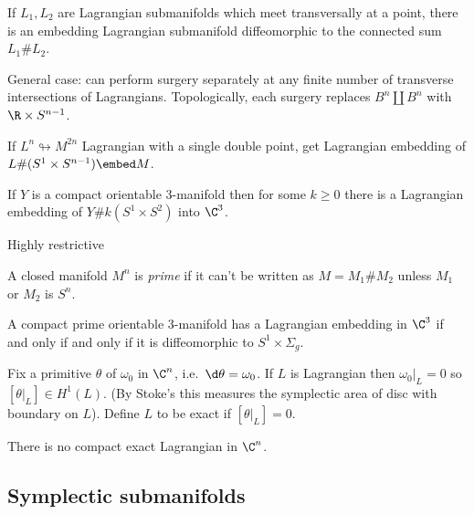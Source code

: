 \documentclass[a4paper]{article}
\newcommand{\immersion}{\looparrowright}
\begin{document}
\begin{corollary}
  If \(L_1, L_2\) are Lagrangian submanifolds which meet transversally at a point, there is an embedding Lagrangian submanifold diffeomorphic to the connected sum \(L_1 \# L_2\).
\end{corollary}

General case: can perform surgery separately at any finite number of transverse intersections of Lagrangians. Topologically, each surgery replaces \(B^n \amalg B^n\) with \(\R \times S^{n - 1}\).

\begin{eg}
  If \(L^n \immersion M^{2n}\) Lagrangian with a single double point, get Lagrangian embedding of \(L \# (S^1 \times S^{n - 1}) \embed M\).
\end{eg}

\begin{corollary}
  If \(Y\) is a compact orientable 3-manifold then for some \(k \geq 0\) there is a Lagrangian embedding of \(Y \# k(S^1 \times S^2)\) into \(\C^3\).
\end{corollary}

Highly restrictive

\begin{definition}
  A closed manifold \(M^n\) is \emph{prime} if it can't be written as \(M = M_1 \# M_2\) unless \(M_1\) or \(M_2\) is \(S^n\).
\end{definition}

\begin{theorem}[Fukaya]
  A compact prime orientable 3-manifold has a Lagrangian embedding in \(\C^3\) if and only if and only if it is diffeomorphic to \(S^1 \times \Sigma_g\).
\end{theorem}

Fix a primitive \(\theta\) of \(\omega_0\) in \(\C^n\), i.e.\ \(\d \theta = \omega_0\). If \(L\) is Lagrangian then \(\omega_0|_L = 0\) so \([\theta|_L] \in H^1(L)\). (By Stoke's this measures the symplectic area of disc with boundary on \(L\)). Define \(L\) to be exact if \([\theta|_L] = 0\).

\begin{theorem}[Gromov]
  There is no compact exact Lagrangian in \(\C^n\).
\end{theorem}

\subsection{Symplectic submanifolds}
\end{document}
